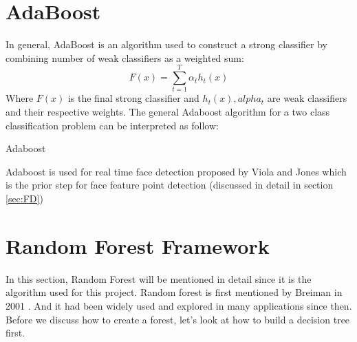 \section{AdaBoost}
\label{sec:adaboost}
In general, AdaBoost is an algorithm used to construct a strong classifier by combining number of weak classifiers as a weighted sum:
\begin{equation}
F(x) = \sum\limits_{t=1}^{T}\alpha_{t}h_{t}(x)
\end{equation}
Where $F(x)$ is the final strong classifier and $h_{t}(x), alpha_{t}$ are weak classifiers and their respective weights. The general Adaboost algorithm for a two class classification problem can be interpreted as follow:
\begin{algorithm}  
\caption{Adaboost}  
\label{alg:Adaboost}  
\begin{algorithmic}  
\ENDFOR
{}
\end{algorithmic}  
\end{algorithm}



Adaboost is used for real time face detection proposed by Viola and Jones which is the prior step for face feature point detection (discussed in detail in section \ref{sec:FD}) 

\clearpage
\section{Random Forest Framework}
\label{sec:RF}
In this section, Random Forest will be mentioned in detail since it is the algorithm used for this project. Random forest is first mentioned by Breiman in 2001 \cite{RFML}. And it had been widely used and explored in many applications since then. Before we discuss how to create a forest, let's look at how to build a decision tree first.
